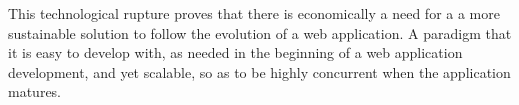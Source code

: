 

This technological rupture proves that there is economically a need for a a more sustainable solution to follow the evolution of a web application.
A paradigm that it is easy to develop with, as needed in the beginning of a web application development, and yet scalable, so as to be highly concurrent when the application matures.


\endinput









